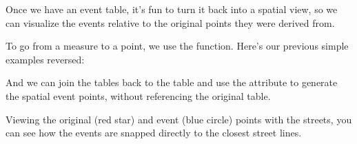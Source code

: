 \documentclass[a4paper,11pt,english]{sphinxmanual}
\begin{document}
Once we have an event table, it’s fun to turn it back into a spatial view, so we can visualize the events relative to the original points they were derived from.

To go from a measure to a point, we use the  function. Here’s our previous simple examples reversed:

\begin{sphinxVerbatim}[commandchars=\\\{\}]
  

\end{sphinxVerbatim}

And we can join the  tables back to the  table and use the  attribute to generate the spatial event points, without referencing the original  table.

\begin{sphinxVerbatim}[commandchars=\\\{\}]
     
     
  
  
   
\end{sphinxVerbatim}

Viewing the original (red star) and event (blue circle) points with the streets, you can see how the events are snapped directly to the closest street lines.
\end{document}
